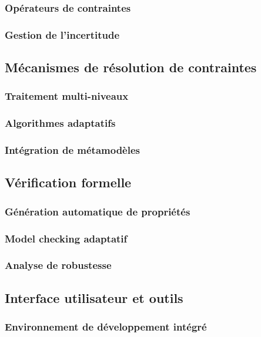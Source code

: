 \documentclass[a4paper,12pt]{article}
\begin{document}
\subsubsection{Opérateurs de contraintes}
\label{sec:orga3185b6}
\subsubsection{Gestion de l'incertitude}
\label{sec:orgabdc90c}
\subsection{Mécanismes de résolution de contraintes}
\label{sec:org8e4a613}
\subsubsection{Traitement multi-niveaux}
\label{sec:org83f05e3}
\subsubsection{Algorithmes adaptatifs}
\label{sec:org9f36b5b}
\subsubsection{Intégration de métamodèles}
\label{sec:orgb9f2478}
\subsection{Vérification formelle}
\label{sec:org40c502f}
\subsubsection{Génération automatique de propriétés}
\label{sec:orgee998da}
\subsubsection{Model checking adaptatif}
\label{sec:org759f101}
\subsubsection{Analyse de robustesse}
\label{sec:org68f5791}
\subsection{Interface utilisateur et outils}
\label{sec:org57d56b3}
\subsubsection{Environnement de développement intégré}
\label{sec:org389e13e}
\end{document}
